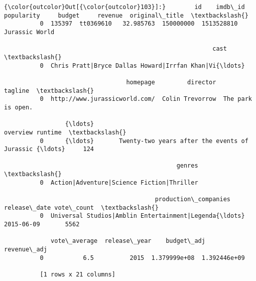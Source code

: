 \documentclass[11pt]{article}
\begin{document}
\begin{Verbatim}[commandchars=\\\{\}]
{\color{outcolor}Out[{\color{outcolor}103}]:}        id    imdb\_id  popularity     budget     revenue  original\_title  \textbackslash{}
          0  135397  tt0369610   32.985763  150000000  1513528810  Jurassic World   
          
                                                          cast  \textbackslash{}
          0  Chris Pratt|Bryce Dallas Howard|Irrfan Khan|Vi{\ldots}   
          
                                  homepage         director            tagline  \textbackslash{}
          0  http://www.jurassicworld.com/  Colin Trevorrow  The park is open.   
          
                 {\ldots}                                                overview runtime  \textbackslash{}
          0      {\ldots}       Twenty-two years after the events of Jurassic {\ldots}     124   
          
                                                genres  \textbackslash{}
          0  Action|Adventure|Science Fiction|Thriller   
          
                                          production\_companies release\_date vote\_count  \textbackslash{}
          0  Universal Studios|Amblin Entertainment|Legenda{\ldots}   2015-06-09       5562   
          
             vote\_average  release\_year    budget\_adj   revenue\_adj  
          0           6.5          2015  1.379999e+08  1.392446e+09  
          
          [1 rows x 21 columns]
\end{Verbatim}
            
\end{document}
